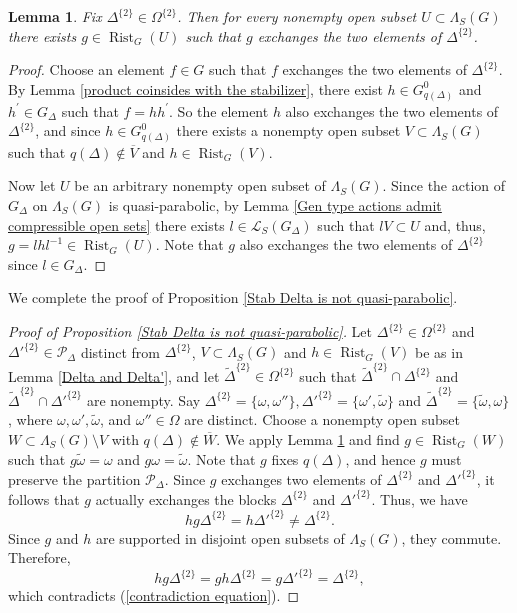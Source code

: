 \documentclass[11pt,letterpaper]{article}
\DeclareMathOperator{\rist}{Rist}
\newtheorem{lem}[thm]{Lemma}
\theoremstyle{definition}
\theoremstyle{remark}
\begin{document}
\begin{lem}\label{L:3.13}
    Fix $\Delta^{\{2\}} \in \Omega^{\{2\}}$. Then for every nonempty open subset $U \subset \Lambda_S(G)$ there exists $g \in \rist_G(U)$ such that $g$ exchanges the two elements of $\Delta^{\{2\}}$.
\end{lem}
\begin{proof}
Choose an element $f \in G$ such that $f$ exchanges the two elements of $\Delta^{\{2\}}$. By Lemma \ref{product coinsides with the stabilizer}, there exist $h \in G_{q(\Delta)}^0$ and $h^{\prime} \in G_{\Delta}$ such that $f=h h^{\prime}$. So the element $h$ also exchanges the two elements of $\Delta^{\{2\}}$, and since $h \in G_{q(\Delta)}^0$ there exists a nonempty open subset $V \subset \Lambda_S(G)$ such that $q(\Delta) \notin \overline{V}$ and $h \in \rist_G(V)$.

Now let $U$ be an arbitrary nonempty open subset of $\Lambda_S(G)$. Since the action of $G_{\Delta}$ on $\Lambda_S(G)$ is quasi-parabolic, by Lemma \ref{Gen type actions admit compressible open sets} there exists $l \in \mathcal{L}_S(G_{\Delta})$ such that $lV \subset U$ and, thus, $g=l hl^{-1} \in \rist_G(U)$. Note that $g$ also exchanges the two elements of $\Delta^{\{2\}}$ since $l \in G_{\Delta}$.
\end{proof}

We complete the proof of Proposition \ref{Stab Delta is not quasi-parabolic}.

\begin{proof}[Proof of Proposition \ref{Stab Delta is not quasi-parabolic}]
    Let $\Delta^{\{2\}} \in \Omega^{\{2\}}$ and $\Delta'^{\{2\}} \in \mathcal{P}_\Delta$ distinct from $\Delta^{\{2\}}$, $V \subset \Lambda_S(G)$ and $h \in \rist_G(V)$ be as in Lemma \ref{Delta and Delta'}, and let $\widetilde{\Delta}^{\{2\}} \in \Omega^{\{2\}}$ such that $\widetilde{\Delta}^{\{2\}} \cap \Delta^{\{2\}}$ and $\widetilde{\Delta}^{\{2\}} \cap \Delta'^{\{2\}}$ are nonempty. Say $\Delta^{\{2\}}=\{\omega, \omega'' \}, \Delta'^{\{2\}}= \{\omega', \widetilde{\omega}\}$ and $\widetilde{\Delta}^{\{2\}}=\{\widetilde{\omega}, \omega\}$, where $\omega, \omega', \widetilde{\omega}$, and $\omega'' \in \Omega$ are distinct. Choose a nonempty open subset $W \subset \Lambda_S(G)\setminus V$ with $q(\Delta) \notin \overline{W}$. We apply Lemma \ref{L:3.13} and find $g \in \rist_G(W)$ such that $g\widetilde{\omega}=\omega$ and $g\omega=\widetilde{\omega}$. Note that $g$ fixes $q(\Delta)$, and hence $g$ must preserve the partition $\mathcal{P}_{\Delta}$. Since $g$ exchanges two elements of $\Delta^{\{2\}}$ and $\Delta'^{\{2\}}$, it follows that $g$ actually exchanges the blocks $\Delta^{\{2\}}$ and $\Delta'^{\{2\}}$.
    Thus, we have
    \begin{equation}\label{contradiction equation}
        hg\Delta^{\{2\}}=h\Delta'^{\{2\}} \neq \Delta^{\{2\}}.
    \end{equation}
    Since $g$ and $h$ are supported in disjoint open subsets of $\Lambda_S(G)$, they commute. Therefore,
    $$
    hg\Delta^{\{2\}}=gh\Delta^{\{2\}}=g\Delta'^{\{2\}}=\Delta^{\{2\}},
    $$ which contradicts (\ref{contradiction equation}).
\end{proof}
\end{document}
